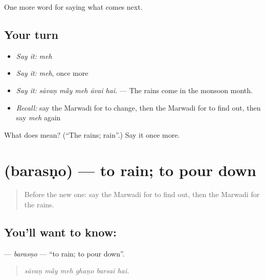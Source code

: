 \begin{grammarlens}[title={What you've built}]
One more word for saying what comes next.
\end{grammarlens}

\subsection*{Your turn}
\begin{itemize}
\raggedright
  \item \emph{Say it:} \emph{meh}
  \item \emph{Say it:} \emph{meh}, once more
  \item \emph{Say it:} \emph{sāvaṇ mā̃y meh āvai hai.} — The rains come in the monsoon month.
  \item \emph{Recall:} say the Marwadi for to change, then the Marwadi for to find out, then say \emph{meh} again
\end{itemize}

\begin{tcolorbox}[breakable,colback=teal!4,colframe=teal!35!black,title={Before you move on}]
What does  mean? (\textquotedblleft{}The rains; rain\textquotedblright{}.) Say it once more.
\end{tcolorbox}
\section[\texorpdfstring{\mw{बरसणो} (barasṇo)}{बरसणो (barasṇo)}]{ (barasṇo) — to rain; to pour down}

\label{lesson:MW-C221-barasno}



\begin{quote}
Before the new one: say the Marwadi for to find out, then the Marwadi for the rains.
\end{quote}

\subsection*{You'll want to know: }
\textbf{} — \emph{barasṇo} — \textquotedblleft{}to rain; to pour down\textquotedblright{}.

\begin{quote}
     
\end{quote}

\begin{quote}
\emph{sāvaṇ mā̃y meh ghaṇo barsai hai.}
\end{quote}

